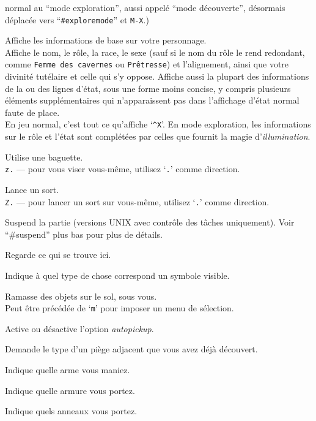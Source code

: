 \documentclass[titlepage]{article}
\begin{document}
\begin{description}[font=\mdseries\ttfamily]
normal au ``mode exploration'', aussi appelé ``mode découverte'', désormais
déplacée vers ``\texttt{\#exploremode}'' et \texttt{M-X}.)
\item[\textasciicircum X]
Affiche les informations de base sur votre personnage.\\
Affiche le nom, le rôle, la race, le sexe (sauf si le nom du rôle le rend
redondant, comme \texttt{Femme des cavernes} ou \texttt{Prêtresse}) et l'alignement,
ainsi que votre divinité tutélaire et celle qui s'y oppose.  Affiche aussi
la plupart des informations de la ou des lignes d'état,
sous une forme moins concise, y compris plusieurs éléments supplémentaires qui
n'apparaissent pas dans l'affichage d'état normal faute de place.\\
En jeu normal, c'est tout ce qu'affiche `\texttt{\textasciicircum X}'.
En mode exploration, les informations sur le rôle et l'état sont complétées par
celles que fournit la magie d'\textit{illumination}.
\item[z]
Utilise une baguette.\\
\texttt{z.} --- pour vous viser vous-même, utilisez `\texttt{.}' comme direction.
\item[Z]
Lance un sort.\\
\texttt{Z.} --- pour lancer un sort sur vous-même, utilisez `\texttt{.}' comme direction.
\item[\textasciicircum Z]
Suspend la partie (versions UNIX avec contrôle des tâches uniquement).
Voir ``\#suspend'' plus bas pour plus de détails.
\item[:]
Regarde ce qui se trouve ici.
\item[;]
Indique à quel type de chose correspond un symbole visible.
\item[,]
Ramasse des objets sur le sol, sous vous.\\
Peut être précédée de `\texttt{m}' pour imposer un menu de sélection.
\item[@]
Active ou désactive l'option \textit{autopickup}.
\item[\textasciicircum]
Demande le type d'un piège adjacent que vous avez déjà découvert.
\item[)]
Indique quelle arme vous maniez.
\item[{]}]
Indique quelle armure vous portez.
\item[=]
Indique quels anneaux vous portez.
\item["]

\end{description}
\end{document}
